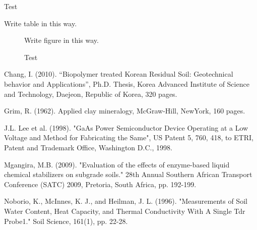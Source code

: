 \documentclass{thesis-SJ}
\begin{document}
	\begin{table}
		\caption{Test}
		Write table in this way. 
	\end{table}
	
	
	\begin{figure}
		Write figure in this way. 
		\caption{Test}
	\end{figure}
	
	
\begin{thebibliography}{10}
	Chang, I. (2010). “Biopolymer treated Korean Residual Soil: Geotechnical behavior and Applications”,  Ph.D. Thesis, Korea Advanced Institute of Science and Technology, Daejeon, Republic of Korea, 320 pages.
	
	Grim, R. (1962). Applied clay mineralogy, McGraw-Hill, NewYork, 160 pages.
	
	J.L. Lee et al. (1998). "GaAs Power Semiconductor Device Operating at a Low Voltage and Method for Fabricating the Same", US Patent 5, 760, 418, to ETRI, Patent and Trademark Office, Washington D.C., 1998.
	
	Mgangira, M.B. (2009). "Evaluation of the effects of enzyme-based liquid chemical stabilizers on subgrade soils." 28th Annual Southern African Transport Conference (SATC) 2009, Pretoria, South Africa, pp. 192-199.
	
	Noborio, K., McInnes, K. J., and Heilman, J. L. (1996). "Measurements of Soil Water Content, Heat Capacity, and Thermal Conductivity With A Single Tdr Probe1."  Soil Science, 161(1), pp. 22-28.
	
\end{thebibliography}
	
\end{document}
